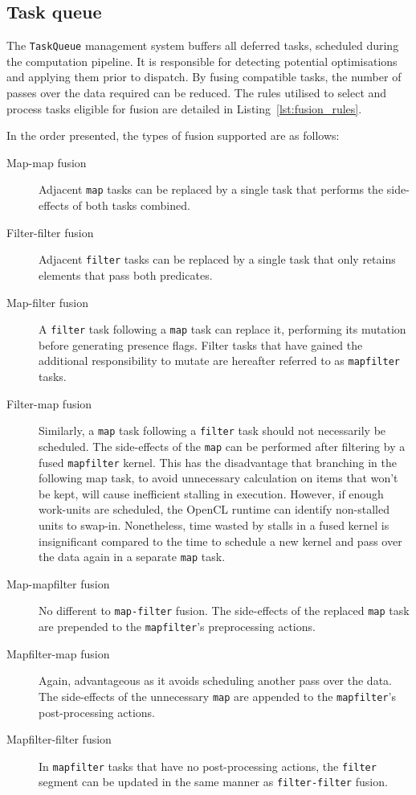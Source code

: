 \subsection{Task queue}
The \verb|TaskQueue| management system buffers all deferred tasks, scheduled during the computation pipeline. It is responsible for detecting potential optimisations and applying them prior to dispatch.
By fusing compatible tasks, the number of passes over the data required can be reduced. The rules utilised to select and process tasks eligible for fusion are detailed in Listing~\ref{lst:fusion_rules}.

In the order presented, the types of fusion supported are as follows:
\begin{description}
\item[Map-map fusion] Adjacent \verb|map| tasks can be replaced by a single task that performs the side-effects of both tasks combined.

\item[Filter-filter fusion] Adjacent \verb|filter| tasks can be replaced by a single task that only retains elements that pass both predicates.

\item[Map-filter fusion] A \verb|filter| task following a \verb|map| task can replace it, performing its mutation before generating presence flags. Filter tasks that have gained the additional responsibility to mutate are hereafter referred to as \verb|mapfilter| tasks.

\item[Filter-map fusion] Similarly, a \verb|map| task following a \verb|filter| task should not necessarily be scheduled. The side-effects of the \verb|map| can be performed after filtering by a fused \verb|mapfilter| kernel. This has the disadvantage that branching in the following map task, to avoid unnecessary calculation on items that won't be kept, will cause inefficient stalling in execution. However, if enough work-units are scheduled, the \ac{OpenCL} runtime can identify non-stalled units to swap-in. Nonetheless, time wasted by stalls in a fused kernel is insignificant compared to the time to schedule a new kernel and pass over the data again in a separate \verb|map| task.

\item[Map-mapfilter fusion] No different to \verb|map-filter| fusion. The side-effects of the replaced \verb|map| task are prepended to the \verb|mapfilter|'s preprocessing actions.

\item[Mapfilter-map fusion] Again, advantageous as it avoids scheduling another pass over the data. The side-effects of the unnecessary \verb|map| are appended to the \verb|mapfilter|'s post-processing actions.

\item[Mapfilter-filter fusion] In \verb|mapfilter| tasks that have no post-processing actions, the \verb|filter| segment can be updated in the same manner as \verb|filter-filter| fusion.
\end{description}

